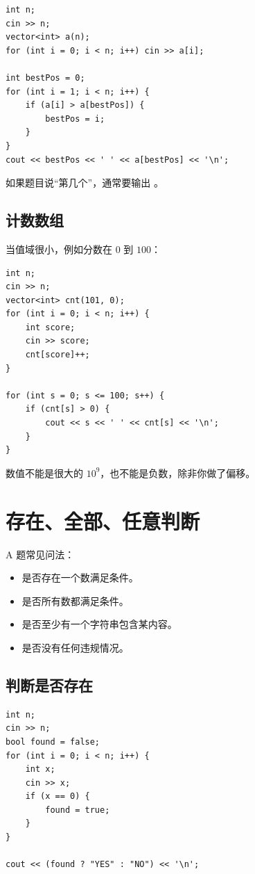 \begin{lstlisting}
int n;
cin >> n;
vector<int> a(n);
for (int i = 0; i < n; i++) cin >> a[i];

int bestPos = 0;
for (int i = 1; i < n; i++) {
    if (a[i] > a[bestPos]) {
        bestPos = i;
    }
}
cout << bestPos << ' ' << a[bestPos] << '\n';
\end{lstlisting}

如果题目说“第几个”，通常要输出 。

\subsection{计数数组}

当值域很小，例如分数在 $0$ 到 $100$：

\begin{lstlisting}
int n;
cin >> n;
vector<int> cnt(101, 0);
for (int i = 0; i < n; i++) {
    int score;
    cin >> score;
    cnt[score]++;
}

for (int s = 0; s <= 100; s++) {
    if (cnt[s] > 0) {
        cout << s << ' ' << cnt[s] << '\n';
    }
}
\end{lstlisting}

数值不能是很大的 $10^9$，也不能是负数，除非你做了偏移。

\section{存在、全部、任意判断}\label{sec:05-9}

A 题常见问法：

\begin{itemize}
  \item 是否存在一个数满足条件。
  \item 是否所有数都满足条件。
  \item 是否至少有一个字符串包含某内容。
  \item 是否没有任何违规情况。
\end{itemize}

\subsection{判断是否存在}

\begin{lstlisting}
int n;
cin >> n;
bool found = false;
for (int i = 0; i < n; i++) {
    int x;
    cin >> x;
    if (x == 0) {
        found = true;
    }
}

cout << (found ? "YES" : "NO") << '\n';
\end{lstlisting}

